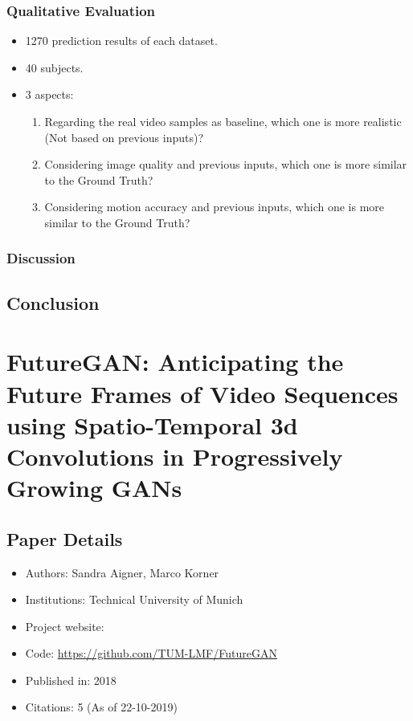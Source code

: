 \documentclass{article}
\begin{document}
    \subsubsection{Qualitative Evaluation}\label{subsubsec:Video_Prediction_via_Selective_Sampling_(VPSS)_(2018_NIPS):qualitative-evaluation}
    \begin{itemize}
        \item 1270 prediction results of each dataset.
        \item 40 subjects.
        \item 3 aspects:
        \begin{enumerate}
            \item Regarding the real video samples as baseline, which one is more realistic (Not based on previous inputs)?
            \item Considering image quality and previous inputs, which one is more similar to the Ground Truth?
            \item Considering motion accuracy and previous inputs, which one is more similar to the Ground Truth?
        \end{enumerate}
    \end{itemize}

    \subsubsection{Discussion}\label{subsubsec:Video_Prediction_via_Selective_Sampling_(VPSS)_(2018_NIPS):discussion}

    \subsection{Conclusion}\label{subsec:Video_Prediction_via_Selective_Sampling_(VPSS)_(2018_NIPS):conclusion}
    \newpage


    \section{FutureGAN: Anticipating the Future Frames of Video Sequences using Spatio-Temporal 3d Convolutions in Progressively Growing GANs}\label{sec:FutureGAN_Anticipating_the_Future_Frames_of_Video_Sequences_using_Spatio_Temporal_3d_Convolutions_in_Progressively_Growing_GANs}
    \subsection*{Paper Details}
    \begin{itemize}
        \item Authors: Sandra Aigner, Marco Korner
        \item Institutions: Technical University of Munich
        \item Project website:
        \item Code: \url{https://github.com/TUM-LMF/FutureGAN}
        \item Published in: 2018
        \item Citations: 5 (As of 22-10-2019)
    \end{itemize}
\end{document}

